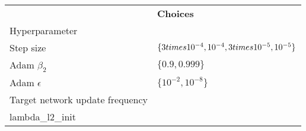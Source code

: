 \begin{tabular}{ll}
 & \bfseries Choices \\
Hyperparameter &  \\
Step size & $\{3 \\times 10^{-4}, 10^{-4}, 3 \\times 10^{-5}, 10^{-5}\}$ \\
Adam $\beta_2$ & $\{0.9, 0.999\}$ \\
Adam $\epsilon$ & $\{10^{-2}, 10^{-8}\}$ \\
Target network update frequency &  \\
lambda_l2_init &  \\
\end{tabular}
